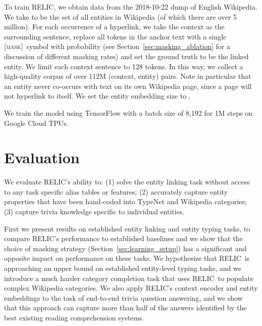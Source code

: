 \documentclass{article} \usepackage{iclr2020_conference,times}
\newcommand{\blank}{\textsc{[mask]}}
\newcommand{\ack}{RELIC\xspace}
\begin{document}
To train \ack, we obtain data from the 2018-10-22 dump of English Wikipedia. We take  to be the set of all entities in Wikipedia (of which there are over 5 million).
For each occurrence of a hyperlink, we take the context as the surrounding sentence, replace all tokens in the anchor text with a single \blank~symbol with probability  (see Section~\ref{sec:masking_ablation} for a discussion of different masking rates) and set the ground truth to be the linked entity.
We limit each context sentence to 128 tokens.
In this way, we collect a high-quality corpus of over 112M (context, entity) pairs.
Note in particular that an entity never co-occurs with text on its own Wikipedia page, since a page will not hyperlink to itself.
We set the entity embedding size to . 

We train the model using TensorFlow \citep{abadi2016tensorflow} with a batch size of 8,192 for 1M steps on Google Cloud TPUs. 


\section{Evaluation} \label{sec:evaluation}
We evaluate \ack's ability to: (1) solve the entity linking task without access to any task specific alias tables or features; (2) accurately capture entity properties that have been hand-coded into TypeNet and Wikipedia categories; (3) capture trivia knowledge specific to individual entities.

First we present results on established entity linking and entity typing tasks, to compare \ack's performance to established baselines and we show that the choice of masking strategy (Section~\ref{sec:learning_setup}) has a significant and opposite impact on performance on these tasks. 
We hypothesize that \ack~is approaching an upper bound on established entity-level typing tasks, and we introduce a much harder category completion task that uses \ack~to populate complex Wikipedia categories. We also apply \ack's context encoder and entity embeddings to the task of end-to-end trivia question answering, and we show that this approach can capture more than half of the answers identified by the best existing reading comprehension systems.
\end{document}
